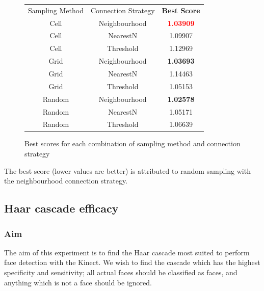 \documentclass[conference]{IEEEtran}
\begin{document}
\begin{figure}
  \centering
  \begin{tabular}{|c|c|c|}
    \cline{1-3}
Sampling Method & Connection Strategy & \textbf{Best Score}      \\ \cline{1-3}
Cell & Neighbourhood & \textbf{\textcolor{red}{1.03909}}         \\ \cline{1-3}
Cell & NearestN  & 1.09907                                       \\ \cline{1-3}
Cell & Threshold & 1.12969                                       \\ \cline{1-3}
Grid & Neighbourhood & \textbf{1.03693}                          \\ \cline{1-3}
Grid & NearestN & 1.14463                                        \\ \cline{1-3}
Grid & Threshold & 1.05153                                       \\ \cline{1-3}
Random & Neighbourhood & \textbf{1.02578}                        \\ \cline{1-3}
Random & NearestN & 1.05171                                      \\ \cline{1-3}
Random & Threshold & 1.06639                                     \\ \cline{1-3}
  \end{tabular}
  \caption{Best scores for each combination of sampling method and connection strategy}
  \label{fig:sampleconntable}
\end{figure}

The best score (lower values are better) is attributed to random sampling with the neighbourhood connection strategy. 

\subsection{Haar cascade efficacy}

\subsubsection{Aim}
The aim of this experiment is to find the Haar cascade most suited to perform face detection with the Kinect. We wish to find the cascade which has the highest specificity and sensitivity; all actual faces should be classified as faces, and anything which is not a face should be ignored.
\end{document}

